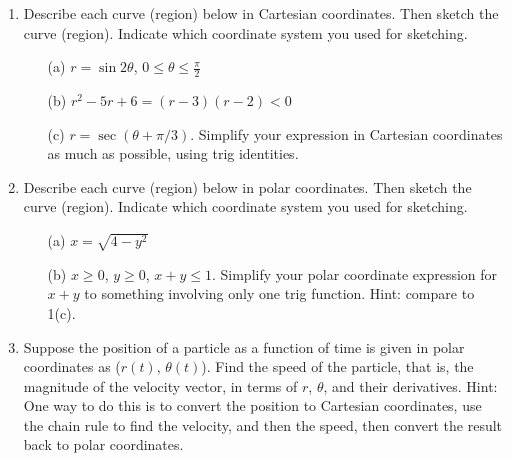 \documentclass[12pt]{article}
\begin{document}
\begin{enumerate}


\item
Describe each curve (region) below  in Cartesian coordinates.  Then sketch the curve (region).  Indicate which coordinate system you used for sketching. 
\begin{enumerate} 




\item[(a)] $r = \sin 2\theta$, $0 \leq \theta \leq \frac{\pi}{2}$


\item[(b)] $r^2 - 5r + 6 = (r-3)(r-2) < 0$  

\item[(c)] $r = \sec(\theta + \pi/3)$. Simplify your expression in Cartesian 
coordinates as much as possible, using trig identities.

\end{enumerate}

\item 
Describe each curve (region) below  in polar coordinates.  Then sketch the curve (region).  
Indicate which coordinate system you used for sketching. 
\begin{enumerate}

\item[(a)] $x = \sqrt{4-y^2}$
\item[(b)] $ x \geq 0$, $y \geq 0$, $x + y \leq 1$. Simplify your polar coordinate expression for $x+y$ to something 
involving only one trig function.  Hint:  compare to 1(c).

\end{enumerate}


\item Suppose the position of a particle as a function of time is given in 
polar coordinates as ($r(t)$, $\theta(t)$).  Find the speed of the particle, 
that is, the magnitude of the velocity vector, in terms of $r$, $\theta$, 
and their derivatives.   Hint: One way to do this is to
convert the position to Cartesian coordinates, 
use the chain rule to find the velocity, and then the speed, 
then convert the result back to polar coordinates.




\end{enumerate}
\end{document}
